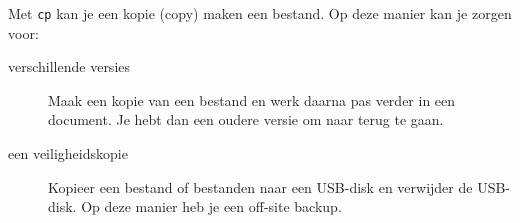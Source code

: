 Met \texttt{cp} kan je een kopie (copy) maken een bestand. Op deze manier kan je zorgen voor:
\begin{description}
\item[verschillende versies] Maak een kopie van een bestand en werk daarna pas verder in een document. Je hebt dan een oudere versie om naar terug te gaan.
\item[een veiligheidskopie] Kopieer een bestand of bestanden naar een USB-disk en verwijder de USB-disk. Op deze manier heb je een off-site backup.
\end{description}

